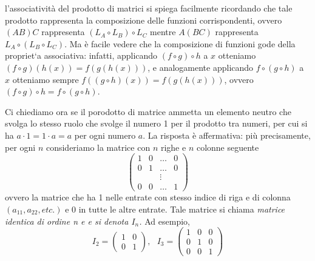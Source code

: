 \begin{osservazione}
  l’associatività del prodotto di matrici si spiega facilmente ricordando che tale
  prodotto rappresenta la composizione delle funzioni corrispondenti, ovvero $(AB)C$ rappresenta
  $(L_A\circ L_B)\circ L_C$ mentre $A(BC)$ rappresenta $L_A\circ (L_B\circ L_C)$. Ma è facile
  vedere che la composizione di funzioni gode della propriet`a associativa: infatti, applicando
  $(f\circ g)\circ h$ a $x$ otteniamo $(f\circ g)(h(x))=f(g(h(x)))$, e analogamente applicando
  $f\circ(g\circ h)$ a $x$ otteniamo sempre $f((g\circ h)(x))=f(g(h(x)))$, ovvero $(f\circ g)
  \circ h= f\circ (g\circ h)$.
\end{osservazione}
Ci chiediamo ora se il porodotto di matrice ammetta un elemento neutro che svolga lo stesso
ruolo che svolge il numero 1 per il prodotto tra numeri, per cui si ha $a \cdot 1 =1 \cdot a=a$
per ogni numero $a$. La risposta è affermativa: più precisamente, per ogni $n$ consideriamo la
matrice con $n$ righe e $n$ colonne seguente
\begin{equation}
  \begin{pmatrix}
    1 & 0 &\dots &0\\
    0 &1 &\dots& 0\\
      && \vdots\\
    0& 0&\dots&1
  \end{pmatrix}
\end{equation}
ovvero la matrice che ha 1 nelle entrate con stesso indice di riga e di colonna $(a_{11},a_{22},etc.)$ e 0 in tutte le altre entrate. Tale matrice si chiama \emph{matrice identica di ordine n e
  e si denota $I_n$.} Ad esempio,
\begin{equation*}
  I_2=
  \begin{pmatrix}
    1 &0\\
    0 &1
  \end{pmatrix}, \text{ }
  I_3=
  \begin{pmatrix}
    1 &0&0\\
    0&1&0\\
    0&0&1
  \end{pmatrix}
\end{equation*}
